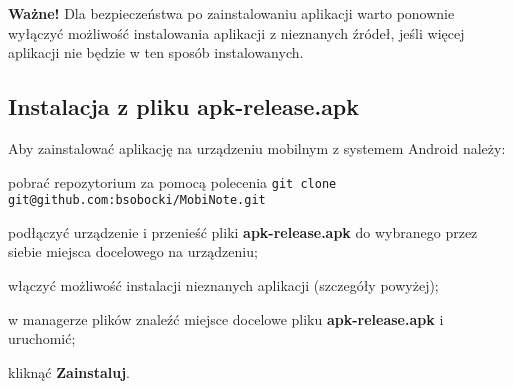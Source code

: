\documentclass[shortabstract]{iithesis}
\begin{document}
\textbf{Ważne!} Dla bezpieczeństwa po zainstalowaniu aplikacji warto ponownie wyłączyć możliwość instalowania aplikacji z nieznanych źródeł, jeśli więcej aplikacji nie będzie w ten sposób instalowanych.

\subsection{Instalacja z pliku apk-release.apk}

Aby zainstalować aplikację na urządzeniu mobilnym z systemem Android należy:
\begin{compactitem}
    \setlength\itemsep{0mm}
    \item pobrać repozytorium za pomocą polecenia
    \newline
    \verb|git clone git@github.com:bsobocki/MobiNote.git|
    \item podłączyć urządzenie i przenieść pliki \textbf{apk-release.apk} do wybranego przez siebie miejsca docelowego na urządzeniu;
    \item włączyć możliwość instalacji nieznanych aplikacji (szczegóły powyżej);
    \item w managerze plików znaleźć miejsce docelowe pliku \textbf{apk-release.apk} i uruchomić;
    \item kliknąć \textbf{Zainstaluj}.
\end{compactitem}




\end{document}
